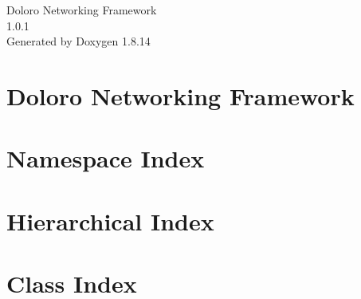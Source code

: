 \documentclass[twoside]{book}
\newcommand{\+}{\discretionary{\mbox{\scriptsize$\hookleftarrow$}}{}{}}
\newcommand{\clearemptydoublepage}{%
  \newpage{\pagestyle{empty}\cleardoublepage}%
}
\begin{document}
\hypersetup{pageanchor=false,
             bookmarksnumbered=true,
             pdfencoding=unicode
            }
\begin{titlepage}
\vspace*{7cm}
\begin{center}%
{\Large Doloro Networking Framework \\[1ex]\large 1.\+0.\+1 }\\
\vspace*{1cm}
{\large Generated by Doxygen 1.8.14}\\
\end{center}
\end{titlepage}
\clearemptydoublepage
{}
\tableofcontents
\clearemptydoublepage
{}
\hypersetup{pageanchor=true}

\chapter{Doloro Networking Framework}
\label{md__d_1__work__git_hub_doloro-networking-framework__r_e_a_d_m_e}

\chapter{Namespace Index}

\chapter{Hierarchical Index}

\chapter{Class Index}

\end{document}
